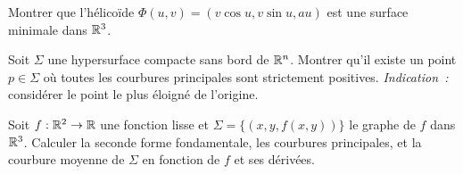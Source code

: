 \begin{exercice}
Montrer que l'h\'elico\"ide $\Phi(u,v) = (v\cos u, v\sin u, au)$ est une surface
minimale dans $\mathbb{R}^3$.
\end{exercice}

\begin{exercice}
Soit $\Sigma$ une hypersurface compacte sans bord de $\mathbb{R}^n$. Montrer qu'il existe
un point $p \in \Sigma$ o\`u toutes les courbures principales sont strictement positives.
\emph{Indication~:} consid\'erer le point le plus \'eloign\'e de l'origine.
\end{exercice}

\begin{exercice}
Soit $f : \mathbb{R}^2 \to \mathbb{R}$ une fonction lisse et $\Sigma = \{(x, y, f(x,y))\}$ le graphe
de $f$ dans $\mathbb{R}^3$. Calculer la seconde forme fondamentale, les courbures principales,
et la courbure moyenne de $\Sigma$ en fonction de $f$ et ses d\'eriv\'ees.
\end{exercice}

